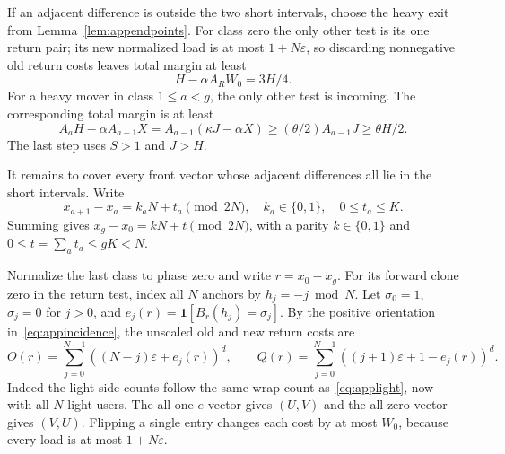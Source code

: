 \documentclass[manuscript,review,anonymous]{acmart}
\newcommand{\ind}{\mathbf 1}
\begin{document}
If an adjacent difference is outside the two short intervals, choose the heavy exit from Lemma~\ref{lem:appendpoints}. For class zero the only other test is its one return pair; its new normalized load is at most $1+N\varepsilon$, so discarding nonnegative old return costs leaves total margin at least
\begin{equation}\label{eq:approotexit}
 H-\alpha A_RW_0=3H/4.
\end{equation}
For a heavy mover in class $1\le a<g$, the only other test is incoming. The corresponding total margin is at least
\begin{equation}\label{eq:appmiddleexit}
 A_aH-\alpha A_{a-1}X
 =A_{a-1}(\kappa J-\alpha X)
 \ge(\theta/2)A_{a-1}J\ge\theta H/2.
\end{equation}
The last step uses $S>1$ and $J>H$.

It remains to cover every front vector whose adjacent differences all lie in the short intervals. Write
\begin{equation}\label{eq:appshortdifferences}
 x_{a+1}-x_a=k_aN+t_a\pmod{2N},\quad
 k_a\in\{0,1\},\quad0\le t_a\le K.
\end{equation}
Summing gives $x_g-x_0=kN+t\pmod{2N}$, with a parity $k\in\{0,1\}$ and $0\le t=\sum_at_a\le gK<N$.

Normalize the last class to phase zero and write $r=x_0-x_g$. For its forward clone zero in the return test, index all $N$ anchors by $h_j=-j\bmod N$. Let $\sigma_0=1$, $\sigma_j=0$ for $j>0$, and $e_j(r)=\ind[B_r(h_j)=\sigma_j]$. By the positive orientation in~\eqref{eq:appincidence}, the unscaled old and new return costs are
\begin{equation}\label{eq:appreturncosts}
 O(r)=\sum_{j=0}^{N-1}((N-j)\varepsilon+e_j(r))^d,\qquad
 Q(r)=\sum_{j=0}^{N-1}((j+1)\varepsilon+1-e_j(r))^d.
\end{equation}
Indeed the light-side counts follow the same wrap count as~\eqref{eq:applight}, now with all $N$ light users. The all-one $e$ vector gives $(U,V)$ and the all-zero vector gives $(V,U)$. Flipping a single entry changes each cost by at most $W_0$, because every load is at most $1+N\varepsilon$.
\end{document}
